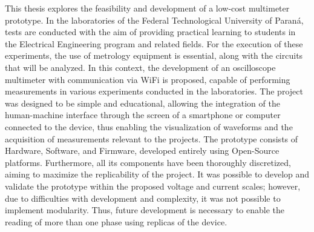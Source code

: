 
\begin{abstractutfpr}%
This thesis explores the feasibility and development of a low-cost multimeter prototype. In the laboratories of the Federal Technological University of Paraná, tests are conducted with the aim of providing practical learning to students in the Electrical Engineering program and related fields. For the execution of these experiments, the use of metrology equipment is essential, along with the circuits that will be analyzed.
In this context, the development of an oscilloscope multimeter with communication via WiFi is proposed, capable of performing measurements in various experiments conducted in the laboratories. The project was designed to be simple and educational, allowing the integration of the human-machine interface through the screen of a smartphone or computer connected to the device, thus enabling the visualization of waveforms and the acquisition of measurements relevant to the projects.
The prototype consists of Hardware, Software, and Firmware, developed entirely using Open-Source platforms. Furthermore, all its components have been thoroughly discretized, aiming to maximize the replicability of the project.
It was possible to develop and validate the prototype within the proposed voltage and current scales; however, due to difficulties with development and complexity, it was not possible to implement modularity. Thus, future development is necessary to enable the reading of more than one phase using replicas of the device.
\end{abstractutfpr}